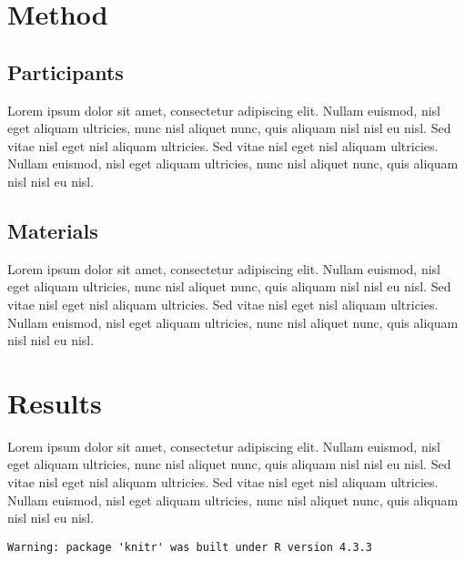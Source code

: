 \documentclass[
  jou,
  longtable,
  nolmodern,
  notxfonts,
  notimes,
  colorlinks=true,linkcolor=blue,citecolor=blue,urlcolor=blue,
  jou]{apa7}
\begin{document}
\section{Method}\label{method}

\subsection{Participants}\label{participants}

Lorem ipsum dolor sit amet, consectetur adipiscing elit. Nullam euismod,
nisl eget aliquam ultricies, nunc nisl aliquet nunc, quis aliquam nisl
nisl eu nisl. Sed vitae nisl eget nisl aliquam ultricies. Sed vitae nisl
eget nisl aliquam ultricies. Nullam euismod, nisl eget aliquam
ultricies, nunc nisl aliquet nunc, quis aliquam nisl nisl eu nisl.

\subsection{Materials}\label{materials}

Lorem ipsum dolor sit amet, consectetur adipiscing elit. Nullam euismod,
nisl eget aliquam ultricies, nunc nisl aliquet nunc, quis aliquam nisl
nisl eu nisl. Sed vitae nisl eget nisl aliquam ultricies. Sed vitae nisl
eget nisl aliquam ultricies. Nullam euismod, nisl eget aliquam
ultricies, nunc nisl aliquet nunc, quis aliquam nisl nisl eu nisl.

\section{Results}\label{results}

Lorem ipsum dolor sit amet, consectetur adipiscing elit. Nullam euismod,
nisl eget aliquam ultricies, nunc nisl aliquet nunc, quis aliquam nisl
nisl eu nisl. Sed vitae nisl eget nisl aliquam ultricies. Sed vitae nisl
eget nisl aliquam ultricies. Nullam euismod, nisl eget aliquam
ultricies, nunc nisl aliquet nunc, quis aliquam nisl nisl eu nisl.

\begin{verbatim}
Warning: package 'knitr' was built under R version 4.3.3
\end{verbatim}
\end{document}

